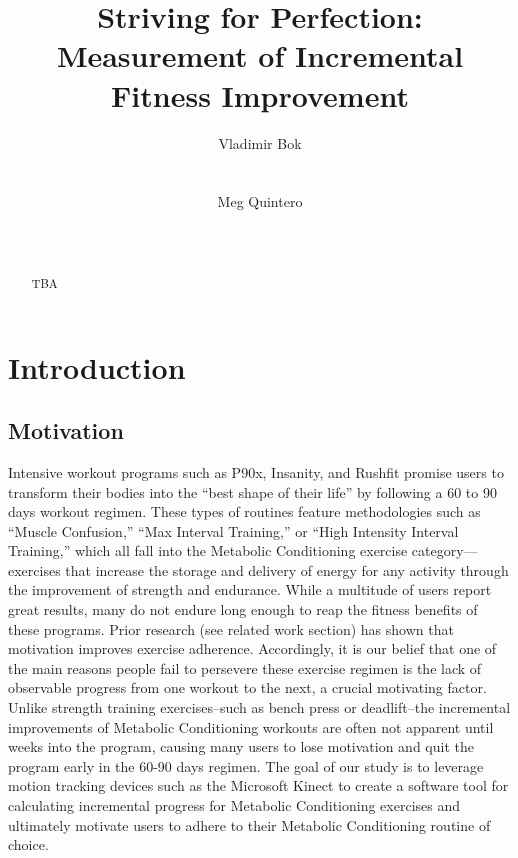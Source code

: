 \documentclass{sigchi}
\begin{document}
\title{Striving for Perfection: Measurement of Incremental Fitness Improvement}

\author{
  \alignauthor Vladimir Bok\\
    \\
    \\
  \alignauthor Meg Quintero\\
    \\
    \\
}

\maketitle

\begin{abstract}
TBA
\end{abstract}


\section{Introduction}
\subsection{Motivation}
Intensive workout programs such as P90x, Insanity, and Rushfit promise users to transform their bodies into the “best shape of their life” by following a 60 to 90 days workout regimen.  These types of routines feature methodologies such as “Muscle Confusion,” “Max Interval Training,” or “High Intensity Interval Training,” which all fall into the Metabolic Conditioning exercise category---exercises that increase the storage and delivery of energy for any activity through the improvement of strength and endurance.  While a multitude of users report great results, many do not endure long enough to reap the fitness benefits of these programs. Prior research (see related work section) has shown that motivation improves exercise adherence. Accordingly, it is our belief that one of the main reasons people fail to persevere these exercise regimen is the lack of observable progress from one workout to the next, a crucial motivating factor. Unlike strength training exercises--such as bench press or deadlift--the incremental improvements of Metabolic Conditioning workouts are often not apparent until weeks into the program, causing many users to lose motivation and quit the program early in the 60-90 days regimen. The goal of our study is to leverage motion tracking devices such as the Microsoft Kinect to create a software tool for calculating incremental progress for Metabolic Conditioning exercises and ultimately motivate users to adhere to their Metabolic Conditioning routine of choice.
\end{document}
